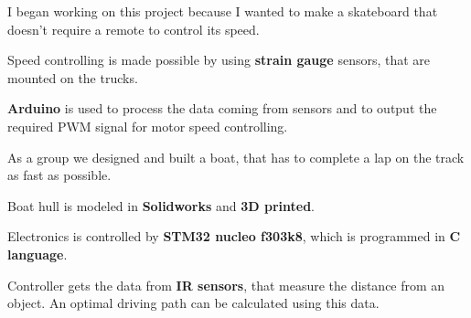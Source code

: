 \documentclass[letterpaper]{deedy-resume} %
\begin{document}
\begin{minipage}[t]{0.66\textwidth}
\begin{tightitemize}
  \item I began working on this project because I wanted to make a skateboard that doesn't require a remote to control its speed.
  \item Speed controlling is made possible by using \textbf{strain gauge} sensors, that are mounted on the trucks.
  \item \textbf{Arduino} is used to process the data coming from sensors and to output the required PWM signal for motor speed controlling.
\end{tightitemize}

\sectionspace %



\begin{tightitemize}
  \item As a group we designed and built a boat, that has to complete a lap on the track as fast as possible.
  \item Boat hull is modeled in \textbf{Solidworks} and \textbf{3D printed}.
  \item Electronics is controlled by \textbf{STM32 nucleo f303k8}, which is programmed in \textbf{C language}.
  \item Controller gets the data from \textbf{IR sensors}, that measure the distance from an object. An optimal driving path can be calculated using this data.
\end{tightitemize}



\end{minipage}
\end{document}
